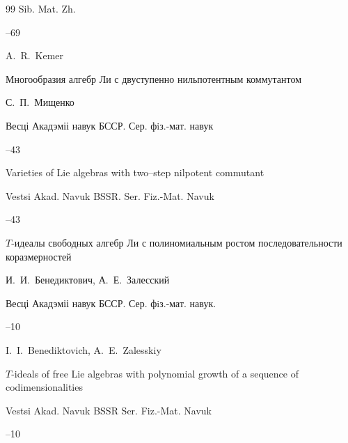 \begin{thebibliography}{99}
\jour Sib. Mat. Zh. 



--69 


\by A.~R.~Kemer








\paper Многообразия алгебр Ли с двуступенно нильпотентным коммутантом

\by С.~П.~Мищенко

\jour Весці Акадэміі навук БССР. Сер. фiз.-мат. навук



--43

\misctransl

\paper Varieties of Lie algebras with two–step nilpotent commutant

\jour Vestsi Akad. Navuk BSSR. Ser. Fiz.-Mat. Navuk 



–43




\paper $T$-идеалы свободных алгебр Ли с полиномиальным ростом последовательности коразмерностей

\by И.~И.~Бенедиктович, А.~Е.~Залесский

\jour Весці Акадэміі навук БССР. Сер. фiз.-мат. навук.



--10



\misctransl

\by I.~I.~Benediktovich, A.~E.~Zalesskiy

\paper $T$-ideals of free Lie algebras with polynomial growth of a sequence of codimensionalities

\jour Vestsi Akad. Navuk BSSR Ser. Fiz.-Mat. Navuk 



–10




\end{thebibliography}
